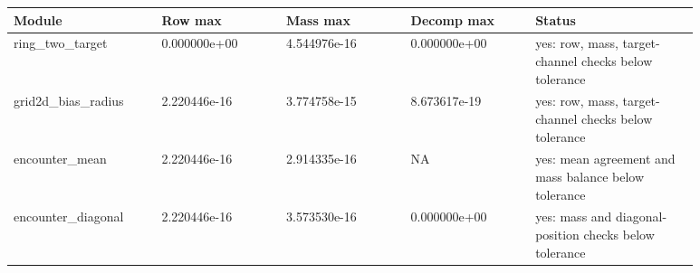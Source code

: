 \begin{tabular}{p{0.19\linewidth}p{0.16\linewidth}p{0.16\linewidth}p{0.16\linewidth}p{0.21\linewidth}}
\toprule
Module & Row max & Mass max & Decomp max & Status \\
\midrule
ring\_two\_target & 0.000000e+00 & 4.544976e-16 & 0.000000e+00 & yes: row, mass, target-channel checks below tolerance \\
grid2d\_bias\_radius & 2.220446e-16 & 3.774758e-15 & 8.673617e-19 & yes: row, mass, target-channel checks below tolerance \\
encounter\_mean & 2.220446e-16 & 2.914335e-16 & NA & yes: mean agreement and mass balance below tolerance \\
encounter\_diagonal & 2.220446e-16 & 3.573530e-16 & 0.000000e+00 & yes: mass and diagonal-position checks below tolerance \\
\bottomrule
\end{tabular}
